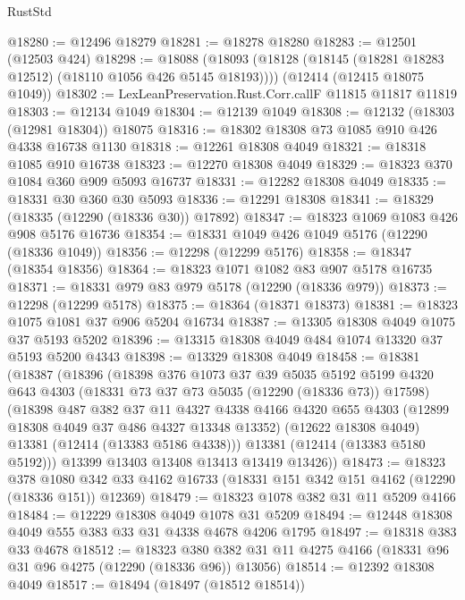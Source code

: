 \begin{lexlean}{RustStd}
\begin{coremodule}
@18280 := @12496 @18279
@18281 := @18278 @18280
@18283 := @12501 (@12503 @424)
@18298 := @18088
    (@18093 (@18128 (@18145 (@18281 @18283 @12512) (@18110 @1056 @426 @5145 @18193))))
    (@12414 (@12415 @18075 @1049))
@18302 := LexLeanPreservation.Rust.Corr.callF @11815 @11817 @11819
@18303 := @12134 @1049
@18304 := @12139 @1049
@18308 := @12132 (@18303 (@12981 @18304)) @18075
@18316 := @18302 @18308 @73 @1085 @910 @426 @4338 @16738 @1130
@18318 := @12261 @18308 @4049
@18321 := @18318 @1085 @910 @16738
@18323 := @12270 @18308 @4049
@18329 := @18323 @370 @1084 @360 @909 @5093 @16737
@18331 := @12282 @18308 @4049
@18335 := @18331 @30 @360 @30 @5093
@18336 := @12291 @18308
@18341 := @18329 (@18335 (@12290 (@18336 @30)) @17892)
@18347 := @18323 @1069 @1083 @426 @908 @5176 @16736
@18354 := @18331 @1049 @426 @1049 @5176 (@12290 (@18336 @1049))
@18356 := @12298 (@12299 @5176)
@18358 := @18347 (@18354 @18356)
@18364 := @18323 @1071 @1082 @83 @907 @5178 @16735
@18371 := @18331 @979 @83 @979 @5178 (@12290 (@18336 @979))
@18373 := @12298 (@12299 @5178)
@18375 := @18364 (@18371 @18373)
@18381 := @18323 @1075 @1081 @37 @906 @5204 @16734
@18387 := @13305 @18308 @4049 @1075 @37 @5193 @5202
@18396 := @13315 @18308 @4049 @484 @1074 @13320 @37 @5193 @5200 @4343
@18398 := @13329 @18308 @4049
@18458 := @18381
    (@18387
      (@18396
        (@18398
          @376
          @1073
          @37
          @39
          @5035
          @5192
          @5199
          @4320
          @643
          @4303
          (@18331 @73 @37 @73 @5035 (@12290 (@18336 @73)) @17598)
          (@18398
            @487
            @382
            @37
            @11
            @4327
            @4338
            @4166
            @4320
            @655
            @4303
            (@12899 @18308 @4049 @37 @486 @4327 @13348 @13352)
            (@12622 @18308 @4049)
            @13381
            (@12414 (@13383 @5186 @4338)))
          @13381
          (@12414 (@13383 @5180 @5192)))
        @13399
        @13403
        @13408
        @13413
        @13419
        @13426))
@18473 := @18323
    @378
    @1080
    @342
    @33
    @4162
    @16733
    (@18331 @151 @342 @151 @4162 (@12290 (@18336 @151)) @12369)
@18479 := @18323 @1078 @382 @31 @11 @5209 @4166
@18484 := @12229 @18308 @4049 @1078 @31 @5209
@18494 := @12448 @18308 @4049 @555 @383 @33 @31 @4338 @4678 @4206 @1795
@18497 := @18318 @383 @33 @4678
@18512 := @18323
    @380
    @382
    @31
    @11
    @4275
    @4166
    (@18331 @96 @31 @96 @4275 (@12290 (@18336 @96)) @13056)
@18514 := @12392 @18308 @4049
@18517 := @18494 (@18497 (@18512 @18514))

\end{coremodule}
\end{lexlean}
